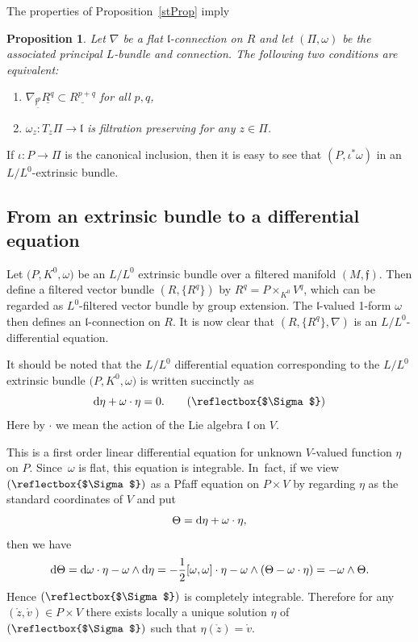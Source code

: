 \documentclass[pdftex]{sigma}%
\newcommand{\f}{\mathfrak f}
\newcommand{\lf}{\mathfrak l}
\newcommand{\om}{\omega}
\DeclareRobustCommand{\amgiS}{\text{\reflectbox{$\Sigma$}}}
\newtheorem{prop}[thm]{Proposition}
\numberwithin{equation}{section}
\begin{document}
	The properties of Proposition~\ref{stProp} imply
	\begin{prop}\label{propEquiv}
		Let $\nabla$ be a flat $\lf$-connection on $R$ and let $(\Pi,\omega)$ be the associated principal $L$-bundle and connection. The following two conditions are equivalent:
		\begin{enumerate}\itemsep=0pt
		\item[$(1)$] $\nabla_{\underline{\f^p}} \underline{R^q}\subset \underline{R^{p+q}}$ for all $p,q$,
			\item[$(2)$] $\omega_z\colon T_z\Pi\to \lf$ is filtration preserving for any $z\in \Pi$.
		\end{enumerate}
	\end{prop}
	
	If $\iota\colon P\to\Pi$ is the canonical inclusion, then it is easy to see that $(P, \iota^*\omega)$ in an $L/L^0$-extrinsic bundle.


\subsection{From an extrinsic bundle to a differential equation}
Let $\big(P,K^0,\om\big)$ be an $L/L^0$ extrinsic bundle over a filtered manifold $(M,\f)$. Then define a filtered vector bundle $(R,\{R^q\})$ by $R^q=P\times_{K^0} V^q$, which can be regarded as $L^0$-filtered vector bundle by group extension. The $\lf$-valued 1-form $\omega$ then defines an $\lf$-connection on $R$. It is now clear that $\left(R,\{R^q\},\nabla\right)$ is an $L/L^0$-differential equation.

It should be noted that the $L/L^0$ differential equation corresponding to the $L/L^0$ extrinsic bundle $\big(P,K^0,\omega\big)$ is written succinctly as
\[
{\rm d}\eta + \omega\cdot\eta = 0.\tag{\amgiS}
\]
Here by $\cdot$ we mean the action of the Lie algebra $\lf$ on $V$.

This is a first order linear differential equation for unknown $V$-valued function $\eta$ on $P$. Since~$\omega$ is flat, this equation is integrable. In~fact, if we view $(\amgiS)$ as a Pfaff equation on $P\times V$ by regarding $\eta$ as the standard coordinates of $V$ and put
\[
\Theta = {\rm d}\eta + \omega\cdot\eta,
\]
then we have
\[
{\rm d}\Theta = {\rm d}\om\cdot \eta - \om\wedge {\rm d}\eta = -\frac12[\om,\om]\cdot\eta -\om\wedge (\Theta -\om\cdot\eta) = -\om\wedge \Theta.
\]
Hence $(\amgiS)$ is completely integrable. Therefore for any $(\mathring{z},\mathring{v})\in P\times V$ there exists locally a unique solution $\eta$ of $(\amgiS)$ such that $\eta(\mathring{z}) =\mathring{v}$.
\end{document}

